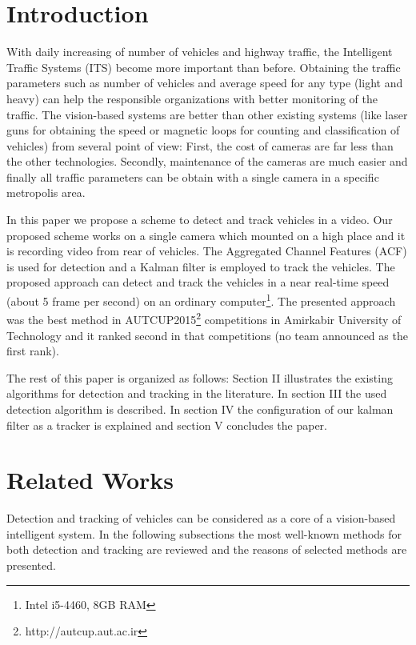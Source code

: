 \documentclass[conference]{IEEEtran}
\begin{document}
\section{Introduction}

With daily increasing of number of vehicles and highway traffic, the Intelligent Traffic Systems (ITS) become more important than before. Obtaining the traffic parameters such as number of vehicles and average speed for any type (light and heavy) can help the responsible organizations with better monitoring of the traffic. The vision-based systems are better than other existing systems (like laser guns for obtaining the speed or magnetic loops for counting and classification of vehicles) from several point of view: First, the cost of cameras are far less than the other technologies. Secondly, maintenance of the cameras are much easier and finally all traffic parameters can be obtain with a single camera in a specific metropolis area. 


In this paper we propose a scheme to detect and track vehicles in a video. Our proposed scheme works on a single camera which mounted on a high place and it is recording video from rear of vehicles. The Aggregated Channel Features (ACF) is used for detection and a Kalman filter is employed to track the vehicles. The proposed approach can detect and track the vehicles in a near real-time speed (about 5 frame per second) on an ordinary computer\footnote{Intel i5-4460, 8GB RAM}. The presented approach was the best method in AUTCUP2015\footnote{http://autcup.aut.ac.ir} competitions in Amirkabir University of Technology and it ranked second in that competitions (no team announced as the first rank).


The rest of this paper is organized as follows: Section II illustrates the existing algorithms for detection and tracking in the literature. In section III the used detection algorithm is described. In section IV the configuration of our kalman filter as a tracker is explained and section V concludes the paper. 
\section{Related Works}
Detection and tracking of vehicles can be considered as a core of a vision-based intelligent system. In the following subsections the most well-known methods for both detection and tracking are reviewed and the reasons of selected methods are presented.
\end{document}
